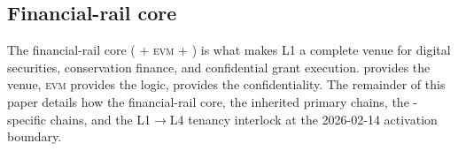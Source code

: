 \subsection{Financial-rail core}

The financial-rail core (\DEX{} + \textsc{evm} + \FHE{}) is what makes
\Zoo{} L1 a complete venue for digital securities, conservation
finance, and confidential \DAO{} grant execution. \DEX{} provides the
venue, \textsc{evm} provides the logic, \FHE{} provides the
confidentiality. The remainder of this paper details how the
financial-rail core, the inherited \Lux{} primary chains, the
\Zoo{}-specific chains, and the L1$\rightarrow$L4 tenancy interlock at
the 2026-02-14 activation boundary.
